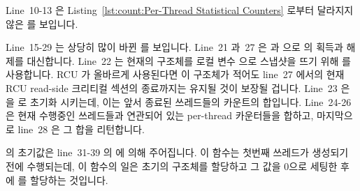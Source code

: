 Line~10-13 은
Listing~\ref{lst:count:Per-Thread Statistical Counters}
로부터 달라지지 않은  를 보입니다.
\iffalse

Lines~1-4 of
Listing~\ref{lst:together:RCU and Per-Thread Statistical Counters}
show the \co{countarray} structure, which contains a
\co{->total} field for the count from previously exited threads,
and a \co{counterp[]} array of pointers to the per-thread
\co{counter} for each currently running thread.
This structure allows a given execution of \co{read_count()}
to see a total that is consistent with the indicated set of running
threads.

Lines~6-8 contain the definition of the per-thread \co{counter}
variable, the global pointer \co{countarrayp} referencing
the current \co{countarray} structure, and
the \co{final_mutex} spinlock.

Lines~10-13 show \co{inc_count()}, which is unchanged from
Listing~\ref{lst:count:Per-Thread Statistical Counters}.
\fi

Line~15-29 는 상당히 많이 바뀐  를 보입니다.
Line~21 과~27 은  과  으로
 의 획득과 해제를 대신합니다.
Line~22 는 현재의  구조체를 로컬 변수  으로 스냅샷을
뜨기 위해  를 사용합니다.
RCU 가 올바르게 사용된다면 이  구조체가 적어도 line~27 에서의
현재 RCU read-side 크리티컬 섹션의 종료까지는 유지될 것이 보장될 겁니다.
Line~23 은  을  로 초기화 시키는데, 이는 앞서 종료된
쓰레드들의 카운트의 합입니다.
Line~24-26 은 현재 수행중인 쓰레드들과 연관되어 있는 per-thread 카운터들을
합하고, 마지막으로 line~28 은 그 합을 리턴합니다.
\iffalse

Lines~15-29 show \co{read_count()}, which has changed significantly.
Lines~21 and~27 substitute \co{rcu_read_lock()} and
\co{rcu_read_unlock()} for acquisition and release of \co{final_mutex}.
Line~22 uses \co{rcu_dereference()} to snapshot the
current \co{countarray} structure into local variable \co{cap}.
Proper use of RCU will guarantee that this \co{countarray} structure
will remain with us through at least the end of the current RCU
read-side critical section at line~27.
Line~23 initializes \co{sum} to \co{cap->total}, which is the
sum of the counts of threads that have previously exited.
Lines~24-26 add up the per-thread counters corresponding to currently
running threads, and, finally, line~28 returns the sum.
\fi

 의 초기값은 line~31-39 의  에 의해
주어집니다.
이 함수는 첫번째 쓰레드가 생성되기 전에 수행되는데, 이 함수의 일은 초기의
구조체를 할당하고 그 값을 0으로 세팅한 후에  를 할당하는
것입니다.

